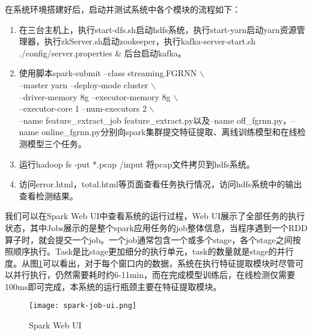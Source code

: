 在系统环境搭建好后，启动并测试系统中各个模块的流程如下：
\begin{enumerate}
  \item 在三台主机上，执行start-dfs.sh启动hdfs系统，执行start-yarn启动yarn资源管理器，执行zkServer.sh启动zookeeper，执行kafka-server-start.sh ./config/server.properties \& 后台启动kafka。
  \item 使用脚本spark-submit --class streaming.FGRNN $\backslash$ \\
  --master yarn --deploy-mode cluster $\backslash$ \\
  --driver-memory 8g --executor-memory 8g $\backslash$ \\
  --executor-core 1 --num-executors 2 $\backslash$ \\
 --name feature\_extract\_job feature\_extract.py以及--name off\_fgrnn.py，--name online\_fgrnn.py分别向spark集群提交特征提取、离线训练模型和在线检测模型三个任务。
 \item 运行hadoop fs -put *.pcap /input 将pcap文件拷贝到hdfs系统。
 \item 访问error.html，total.html等页面查看任务执行情况，访问hdfs系统中的输出查看检测结果。
\end{enumerate}

我们可以在Spark Web UI中查看系统的运行过程，Web UI展示了全部任务的执行状态，其中Jobs展示的是整个spark应用任务的job整体信息，当程序遇到一个RDD算子时，就会提交一个job。一个job通常包含一个或多个stage，各个stage之间按照顺序执行。Task是比stage更加细分的执行单元，task的数量就是stage的并行度。从图\ref{fig:spark-job}可以看出，对于每个窗口内的数据，系统在执行特征提取模块时尽管可以并行执行，仍然需要耗时约6-11min，而在完成模型训练后，在线检测仅需要100ms即可完成，本系统的运行瓶颈主要在特征提取模块。
\begin{figure}
  \centering
  \texttt{[image: spark-job-ui.png]}
  \caption{Spark Web UI}
  \label{fig:spark-job}
\end{figure}

